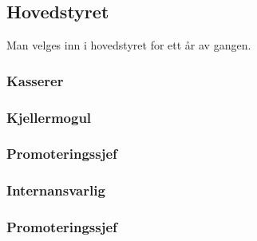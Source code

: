 \documentclass[10pt,norsk,a4paper]{article}
\begin{document}
\begin{minipage}[t]{0.49\textwidth}
\subsection{Hovedstyret} %
Man velges inn i hovedstyret for ett år av gangen.

\subsubsection{Kasserer}
\subsubsection{Kjellermogul}
\subsubsection{Promoteringssjef}
\subsubsection{Internansvarlig}
\subsubsection{Promoteringssjef}

\end{minipage}
\end{document}
